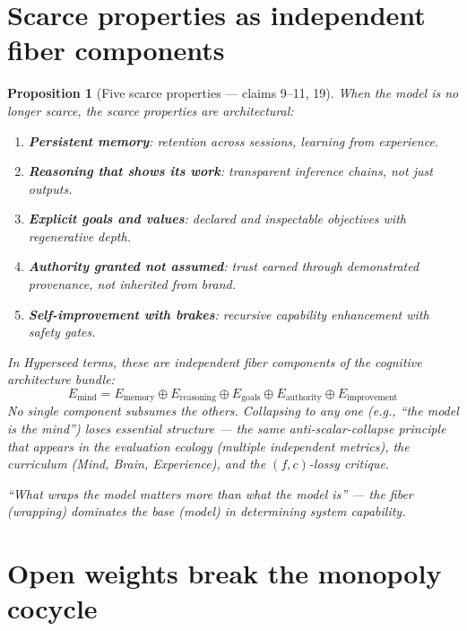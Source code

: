 \documentclass[11pt,a4paper]{article}
\newtheorem{proposition}[definition]{Proposition}
\begin{document}
\section{Scarce properties as independent fiber components}
\label{sec:scarce}

\begin{proposition}[Five scarce properties --- claims 9--11, 19]
\label{prop:scarce}
When the model is no longer scarce, the scarce properties are
architectural:
\begin{enumerate}
\item \textbf{Persistent memory}: retention across sessions, learning
  from experience.
\item \textbf{Reasoning that shows its work}: transparent inference
  chains, not just outputs.
\item \textbf{Explicit goals and values}: declared and inspectable
  objectives with regenerative depth.
\item \textbf{Authority granted not assumed}: trust earned through
  demonstrated provenance, not inherited from brand.
\item \textbf{Self-improvement with brakes}: recursive capability
  enhancement with safety gates.
\end{enumerate}

In Hyperseed terms, these are \emph{independent fiber components} of
the cognitive architecture bundle:
\[
  E_{\text{mind}} = E_{\text{memory}} \oplus E_{\text{reasoning}}
  \oplus E_{\text{goals}} \oplus E_{\text{authority}}
  \oplus E_{\text{improvement}}
\]
No single component subsumes the others. Collapsing to any one
(e.g., ``the model is the mind'') loses essential structure --- the
same anti-scalar-collapse principle that appears in the evaluation
ecology (multiple independent metrics), the curriculum (Mind, Brain,
Experience), and the $(f,c)$-lossy critique.

``What wraps the model matters more than what the model is'' ---
the fiber (wrapping) dominates the base (model) in determining
system capability.
\end{proposition}


\section{Open weights break the monopoly cocycle}
\label{sec:monopoly}
\end{document}
